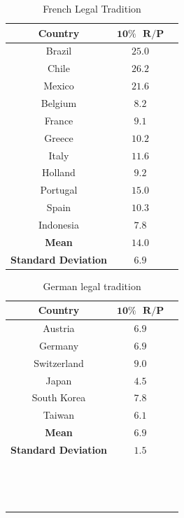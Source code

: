 \documentclass[12pt]{article}
\begin{document}
\begin{table}[htbp!]
	\caption{French Legal Tradition}
	\centering
		\begin{tabular}{ccc}
			\textbf{Country} & $\mathbf{10\% \text{ } R/P}$ &\\
			  \hline
			Brazil&$25.0$\\
			Chile&$26.2$\\
			Mexico&$21.6$\\
			Belgium&$8.2$\\
			France&$9.1$\\
            Greece&$10.2$\\
            Italy&$11.6$\\
            Holland&$9.2$\\
            Portugal&$15.0$\\
            Spain&$10.3$\\
            Indonesia&$7.8$\\
            \hline
            \textbf{Mean}&$\mathbf{14.0}$\\
            \textbf{Standard Deviation}&$\mathbf{6.9}$\\
			\hline
		\end{tabular}
\end{table}

\pagebreak

\begin{table}[htbp!]
	\caption{German legal tradition}
	\centering
		\begin{tabular}{ccc}
			\textbf{Country} & $\mathbf{10\% \text{ } R/P}$ &\\
			  \hline
			Austria&$6.9$\\
			Germany&$6.9$\\
			Switzerland&$9.0$\\
			Japan&$4.5$\\
			South Korea&$7.8$\\
            Taiwan&$6.1$\\
            \hline
            \textbf{Mean}&$\mathbf{6.9}$\\
            \textbf{Standard Deviation}&$\mathbf{1.5}$\\
			\hline
            $ $ & $ $ \\
            $ $ & $ $ \\
            $ $ & $ $ 
		\end{tabular}
\end{table}
\end{document}
